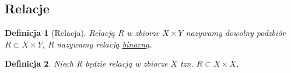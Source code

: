 \documentclass[a5paper,8pt]{article}
\theoremstyle{mythmstyle}
\newtheorem{definition}{Definicja}[section]
\begin{document}
        \subsection{Relacje} %
        \label{sub:relacje}
        
            \begin{definition}[Relacja]
                Relacją R w zbiorze $ X \times Y $ nazywamy dowolny podzbiór $ R \subset X \times Y $,
                R nazywamy relacją \underline{binarną}.
            \end{definition}

            \begin{definition}
                Niech R będzie relacją w zbiorze $ X $ tzn. $ R \subset X \times X $,
                

\end{definition}
\end{document}
